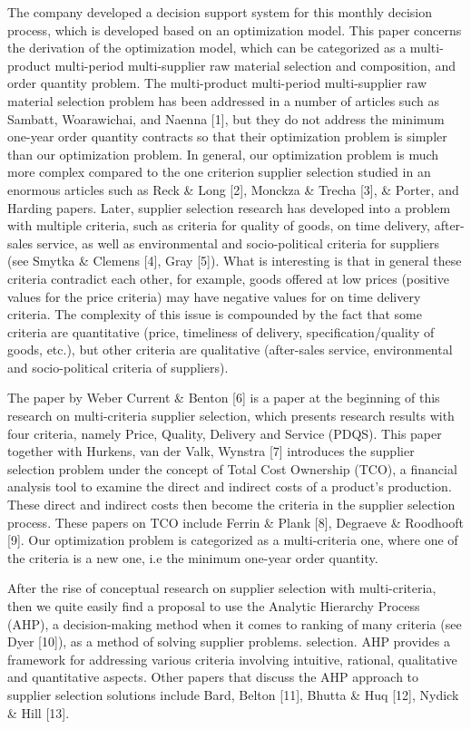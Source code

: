 \documentclass[preprint, 3p,
authoryear]{elsarticle} %
\begin{document}
The company developed a decision support system for this monthly
decision process, which is developed based on an optimization model.
This paper concerns the derivation of the optimization model, which can
be categorized as a multi-product multi-period multi-supplier raw
material selection and composition, and order quantity problem. The
multi-product multi-period multi-supplier raw material selection problem
has been addressed in a number of articles such as Sambatt, Woarawichai,
and Naenna {[}1{]}, but they do not address the minimum one-year order
quantity contracts so that their optimization problem is simpler than
our optimization problem. In general, our optimization problem is much
more complex compared to the one criterion supplier selection studied in
an enormous articles such as Reck \& Long {[}2{]}, Monckza \& Trecha
{[}3{]}, \& Porter, and Harding papers. Later, supplier selection
research has developed into a problem with multiple criteria, such as
criteria for quality of goods, on time delivery, after-sales service, as
well as environmental and socio-political criteria for suppliers (see
Smytka \& Clemens {[}4{]}, Gray {[}5{]}). What is interesting is that in
general these criteria contradict each other, for example, goods offered
at low prices (positive values for the price criteria) may have negative
values for on time delivery criteria. The complexity of this issue is
compounded by the fact that some criteria are quantitative (price,
timeliness of delivery, specification/quality of goods, etc.), but other
criteria are qualitative (after-sales service, environmental and
socio-political criteria of suppliers).

The paper by Weber Current \& Benton {[}6{]} is a paper at the beginning
of this research on multi-criteria supplier selection, which presents
research results with four criteria, namely Price, Quality, Delivery and
Service (PDQS). This paper together with Hurkens, van der Valk, Wynstra
{[}7{]} introduces the supplier selection problem under the concept of
Total Cost Ownership (TCO), a financial analysis tool to examine the
direct and indirect costs of a product's production. These direct and
indirect costs then become the criteria in the supplier selection
process. These papers on TCO include Ferrin \& Plank {[}8{]}, Degraeve
\& Roodhooft {[}9{]}. Our optimization problem is categorized as a
multi-criteria one, where one of the criteria is a new one, i.e the
minimum one-year order quantity.

After the rise of conceptual research on supplier selection with
multi-criteria, then we quite easily find a proposal to use the Analytic
Hierarchy Process (AHP), a decision-making method when it comes to
ranking of many criteria (see Dyer {[}10{]}), as a method of solving
supplier problems. selection. AHP provides a framework for addressing
various criteria involving intuitive, rational, qualitative and
quantitative aspects. Other papers that discuss the AHP approach to
supplier selection solutions include Bard, Belton {[}11{]}, Bhutta \&
Huq {[}12{]}, Nydick \& Hill {[}13{]}.
\end{document}
